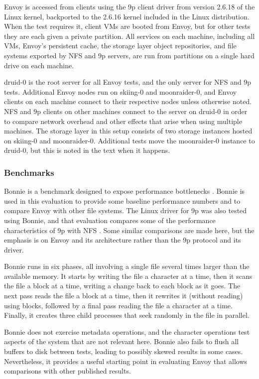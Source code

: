 Envoy is accessed from clients using the 9p client driver from version 2.6.18 of the Linux kernel, backported to the 2.6.16 kernel included in the Linux distribution. When the test requires it, client VMs are booted from Envoy, but for other tests they are each given a private partition. All services on each machine, including all VMs, Envoy's persistent cache, the storage layer object repositories, and file systems exported by NFS and 9p servers, are run from partitions on a single hard drive on each machine.

druid-0 is the root server for all Envoy tests, and the only server for NFS and 9p tests. Additional Envoy nodes run on skiing-0 and moonraider-0, and Envoy clients on each machine connect to their respective nodes unless otherwise noted. NFS and 9p clients on other machines connect to the server on druid-0 in order to compare network overhead and other effects that arise when using multiple machines. The storage layer in this setup consists of two storage instances hosted on skiing-0 and moonraider-0. Additional tests move the moonraider-0 instance to druid-0, but this is noted in the text when it happens.

\subsubsection{Benchmarks}

Bonnie is a benchmark designed to expose performance bottlenecks \cite{bray}. Bonnie is used in this evaluation to provide some baseline performance numbers and to compare Envoy with other file systems. The Linux driver for 9p was also tested using Bonnie, and that evaluation compares some of the performance characteristics of 9p with NFS \cite{hensbergen}. Some similar comparisons are made here, but the emphasis is on Envoy and its architecture rather than the 9p protocol and its driver.

Bonnie runs in six phases, all involving a single file several times larger than the available memory. It starts by writing the file a character at a time, then it scans the file a block at a time, writing a change back to each block as it goes. The next pass reads the file a block at a time, then it rewrites it (without reading) using blocks, followed by a final pass reading the file a character at a time. Finally, it creates three child processes that seek randomly in the file in parallel.

Bonnie does not exercise metadata operations, and the character operations test aspects of the system that are not relevant here. Bonnie also fails to flush all buffers to disk between tests, leading to possibly skewed results in some cases. Nevertheless, it provides a useful starting point in evaluating Envoy that allows comparisons with other published results.

